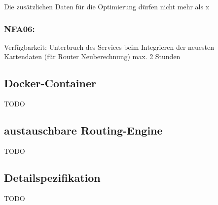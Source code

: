 Die zusätzlichen Daten für die Optimierung dürfen nicht mehr als x%

\subsubsection{NFA06: }
\label{NFA:NFA06}

Verfügbarkeit: Unterbruch des Services beim Integrieren der neuesten Kartendaten (für Router Neuberechnung) max. 2 Stunden

\subsection{Docker-Container}
\label{nfa:Docker-Container}

TODO

\subsection{austauschbare Routing-Engine}
\label{nfa:austauschbare Routing-Engine}

TODO

\subsection{Detailspezifikation}
\label{sub:Detailspezifikation}

TODO
